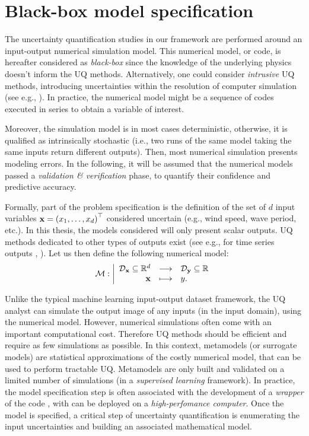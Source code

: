 \section{Black-box model specification}
The uncertainty quantification studies in our framework are performed around an input-output numerical simulation model. 
This numerical model, or code, is hereafter considered as \textit{black-box} since the knowledge of the underlying physics doesn't inform the UQ methods. 
Alternatively, one could consider \textit{intrusive} UQ methods, introducing uncertainties within the resolution of computer simulation (see e.g., ).
In practice, the numerical model might be a sequence of codes executed in series to obtain a variable of interest.

Moreover, the simulation model is in most cases deterministic, otherwise, it is qualified as intrinsically stochastic (i.e., two runs of the same model taking the same inputs return different outputs).
Then, most numerical simulation presents modeling errors. 
In the following, it will be assumed that the numerical models passed a \textit{validation \& verification} phase, to quantify their confidence and predictive accuracy. 

Formally, part of the problem specification is the definition of the set of $d$ input variables ${\bf x} = \left(x_1, \dots, x_d\right)^\top$ considered uncertain (e.g., wind speed, wave period, etc.). 
In this thesis, the models considered will only present scalar outputs. 
UQ methods dedicated to other types of outputs exist (see e.g., for time series outputs \citet{lataniotis_2019}, ). 
Let us then define the following numerical model:
\begin{equation}
\mathcal{M} : \bigg|
    \begin{array}{rcl}
        \mathcal{D}_{{\bf x}} \subseteq \mathbb{R}^d & \longrightarrow & \mathcal{D}_{{\bf y}} \subseteq \mathbb{R} \\
        {\bf x} & \longmapsto & y.
    \end{array}
\end{equation}

Unlike the typical machine learning input-output dataset framework, the UQ analyst can simulate the output image of any inputs (in the input domain), using the numerical model. 
However, numerical simulations often come with an important computational cost. 
Therefore UQ methods should be efficient and require as few simulations as possible. 
In this context, metamodels (or surrogate models) are statistical approximations of the costly numerical model, that can be used to perform tractable UQ. 
Metamodels are only built and validated on a limited number of simulations (in a \textit{supervised learning} framework).
In practice, the model specification step is often associated with the development of a \textit{wrapper} of the code , with can be deployed on a \textit{high-perfomance computer}.
Once the model is specified, a critical step of uncertainty quantification is enumerating the input uncertainties and building an associated mathematical model.


